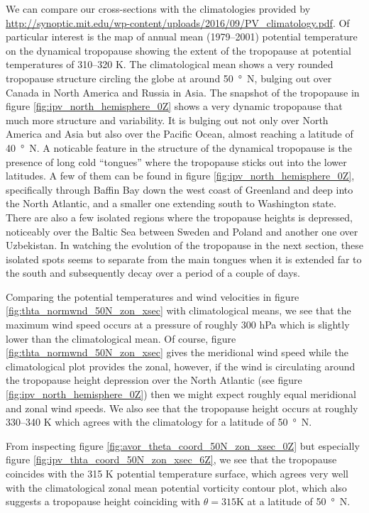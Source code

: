 \documentclass[11pt]{article}
\begin{document}
We can compare our cross-sections with the climatologies provided by \url{http://synoptic.mit.edu/wp-content/uploads/2016/09/PV_climatology.pdf}. Of particular interest is the map of annual mean (1979--2001) potential temperature on the dynamical tropopause showing the extent of the tropopause at potential temperatures of 310--320 K. The climatological mean shows a very rounded tropopause structure circling the globe at around \SI{50}{\degree N}, bulging out over Canada in North America and Russia in Asia. The snapshot of the tropopause in figure \ref{fig:ipv_north_hemisphere_0Z} shows a very dynamic tropopause that much more structure and variability. It is bulging out not only over North America and Asia but also over the Pacific Ocean, almost reaching a latitude of \SI{40}{\degree N}. A noticable feature in the structure of the dynamical tropopause is the presence of long cold ``tongues'' where the tropopause sticks out into the lower latitudes. A few of them can be found in figure \ref{fig:ipv_north_hemisphere_0Z}, specifically through Baffin Bay down the west coast of Greenland and deep into the North Atlantic, and a smaller one extending south to Washington state. There are also a few isolated regions where the tropopause heights is depressed, noticeably over the Baltic Sea between Sweden and Poland and another one over Uzbekistan. In watching the evolution of the tropopause in the next section, these isolated spots seems to separate from the main tongues when it is extended far to the south and subsequently decay over a period of a couple of days.

Comparing the potential temperatures and wind velocities in figure \ref{fig:thta_normwnd_50N_zon_xsec} with climatological means, we see that the maximum wind speed occurs at a pressure of roughly 300 hPa which is slightly lower than the climatological mean. Of course, figure \ref{fig:thta_normwnd_50N_zon_xsec} gives the meridional wind speed while the climatological plot provides the zonal, however, if the wind is circulating around the tropopause height depression over the North Atlantic (see figure \ref{fig:ipv_north_hemisphere_0Z}) then we might expect roughly equal meridional and zonal wind speeds. We also see that the tropopause height occurs at roughly 330--340 K which agrees with the climatology for a latitude of \SI{50}{\degree N}.

From inspecting figure \ref{fig:avor_theta_coord_50N_zon_xsec_0Z} but especially figure \ref{fig:ipv_thta_coord_50N_zon_xsec_6Z}, we see that the tropopause coincides with the 315 K potential temperature surface, which agrees very well with the climatological zonal mean potential vorticity contour plot, which also suggests a tropopause height coinciding with $\theta = 315 \text{K}$ at a latitude of \SI{50}{\degree N}.
\end{document}
